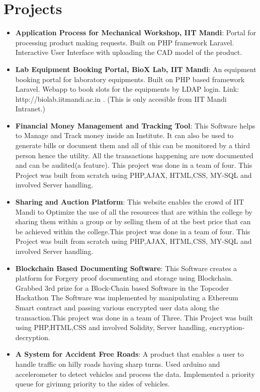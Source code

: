 \documentclass[letterpaper,11pt]{article}
\newcommand{\resumeItem}[2]{
  \item\small{
    \textbf{#1}{: #2 \vspace{-2pt}}
  }
}
\newcommand{\resumeSubItem}[2]{\resumeItem{#1}{#2}\vspace{-4pt}}
\newcommand{\resumeSubHeadingListStart}{\begin{itemize}[leftmargin=*]}
\newcommand{\resumeSubHeadingListEnd}{\end{itemize}}
\begin{document}
\section{Projects}
  \resumeSubHeadingListStart
    \resumeSubItem{Application Process for Mechanical Workshop, IIT Mandi}
      {Portal for processing product making requests. Built on PHP framework Laravel. Interactive User Interface with uploading the CAD model of the product.}
    \resumeSubItem{Lab Equipment Booking Portal, BioX Lab, IIT Mandi}
      {An equipment booking portal for laboratory equipments. Built on PHP based framework Laravel. Webapp to book slots for the equipments by LDAP login. Link: http://biolab.iitmandi.ac.in . (This is only accesible from IIT Mandi Intranet.)}
    \resumeSubItem{Financial Money Management and Tracking Tool}
      {This Software helps to Manage and Track money inside an Institute. It can also be used to generate bills
or document them and all of this can be monitored by a third person hence the utility. All the transactions
happening are now documented and can be audited(a feature). This project was done in a team of four.
This Project was built from scratch using PHP,AJAX, HTML,CSS, MY-SQL and involved Server handling.}
    \resumeSubItem{Sharing and Auction Platform}
      {This website enables the crowd of IIT Mandi to Optimize the use of all the resources that are within the
college by sharing them within a group or by selling them of at the best price that can be achieved within the
college.This project was done in a team of four.
This Project was built from scratch using PHP,AJAX, HTML,CSS, MY-SQL and involved Server handling.}
      \resumeSubItem{Blockchain Based Documenting Software}
      {This Software creates a platform for Forgery proof documenting and storage using Blockchain.
Grabbed 3rd prize for a Block-Chain based Software in the Topcoder Hackathon
The Software was implemented by manipulating a Ethereum Smart contract and passing various encrypted
user data along the transaction.This project was done in a team of Three.
This Project was built using PHP,HTML,CSS and involved Solidity, Server handling, encryption-decryption.}
      \resumeSubItem{A System for Accident Free Roads}
      {A product that enables a user to handle traffic on hilly roads having sharp turns. Used arduino and accelerometer to detect vehicles and process the data. Implemented a priority queue for givimng priority to the sides of vehicles. }
  \resumeSubHeadingListEnd



  
\end{document}
